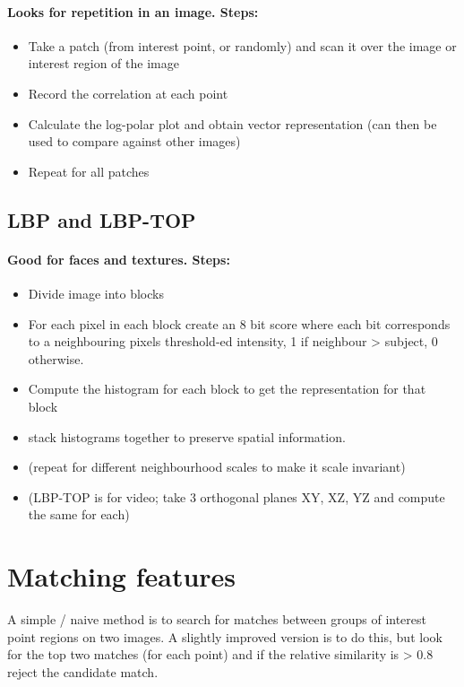 \documentclass[]{article}
\begin{document}
	\paragraph{Looks for repetition in an image. Steps:}
	\begin{itemize}
		\item Take a patch (from interest point, or randomly) and scan it over the image or interest region of the image
		\item Record the correlation at each point
		\item Calculate the log-polar plot and obtain vector representation (can then be used to compare against other images)
		\item Repeat for all patches
	\end{itemize}

	\subsection{LBP and LBP-TOP}
	\paragraph{Good for faces and textures. Steps:}
	\begin{itemize}
		\item Divide image into blocks
		\item For each pixel in each block create an 8 bit score where each bit corresponds to a neighbouring pixels threshold-ed intensity, 1 if neighbour > subject, 0 otherwise.
		\item Compute the histogram for each block to get the representation for that block
		\item stack histograms together to preserve spatial information.
		\item (repeat for different neighbourhood scales to make it scale invariant)
		\item (LBP-TOP is for video; take 3 orthogonal planes XY, XZ, YZ and compute the same for each)
	\end{itemize}
	
	
\section{Matching features}
	\textnormal{A simple / naive method is to search for matches between groups of interest point regions on two images. A slightly improved version is to do this, but look for the top two matches (for each point) and if the relative similarity is > 0.8 reject the candidate match.}
	
\end{document}
